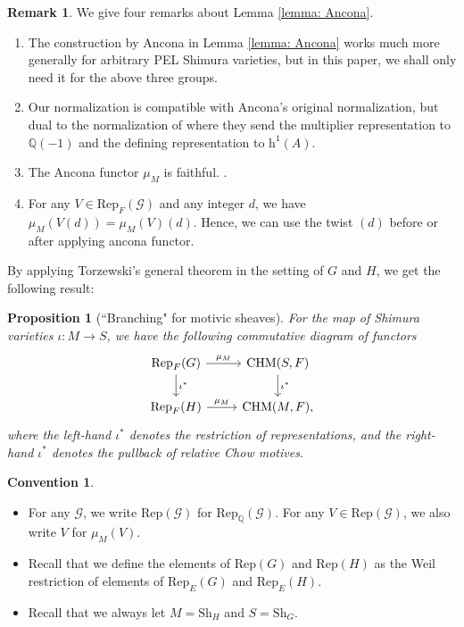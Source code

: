 \documentclass[11pt, a4paper]{amsart}
\theoremstyle{plain}
\newtheorem{proposition}[theorem]{Proposition}
\theoremstyle{definition}
\newtheorem{remark}[theorem]{Remark}
\newtheorem{convention}[theorem]{Convention}
\numberwithin{equation}{section}
\def\calG{\mathcal{G}}
\def\QQ{\mathbb{Q}}
\newcommand{\Sh}{\mathrm{Sh}}
\begin{document}
\begin{remark} We give four remarks about Lemma \ref{lemma: Ancona}. 
\begin{enumerate}
    \item The construction by Ancona in Lemma \ref{lemma: Ancona} works much more generally for arbitrary PEL Shimura varieties, but in this paper, we shall only need it for the above three groups.
    \item Our normalization is compatible with Ancona's original normalization, but dual to the normalization of \cite[Theorem 8.3.1]{LSZ22} where they send the multiplier representation to $\QQ(-1)$ and the defining representation to $\mathrm{h}^{1}(A)$.
    \item The Ancona functor $\mu_{M}$ is faithful. \cite[REMARK 5.10]{Torzewski19}. 
    \item For any $V \in \mathrm{Rep}_{F}(\calG)$ and any integer $d$, we have $\mu_{M}(V(d)) = \mu_{M}(V)(d)$. Hence, we can use the twist $(d)$ before or after applying ancona functor. 
\end{enumerate}
\end{remark}

\par By applying Torzewski's general theorem \cite[Theorem 9.7]{Torzewski19} in the setting of $G$ and $H$, we get the following result: 
\begin{proposition}[``Branching" for motivic sheaves]
For the map of Shimura varieties $\iota: M \rightarrow S$, we have the following commutative diagram of functors 
\[
    \begin{tikzcd}
        \mathrm{Rep}_{F}(G) \ar[d, "\iota^{*}"] \ar[r, "\mu_{M}"] & \mathrm{CHM}(S, F) \ar[d, "\iota^{*}"] \\
        \mathrm{Rep}_{F}(H) \ar[r, "\mu_{M}"] & \mathrm{CHM}(M, F), 
    \end{tikzcd}
\]
where the left-hand $\iota^{*}$ denotes the restriction of representations, and the right-hand $\iota^{*}$ denotes the pullback of relative Chow motives.

\end{proposition}

\begin{convention}
\begin{itemize}
    \item For any $\mathcal{G}$, we write $\mathrm{Rep}(\mathcal{G})$ for $\mathrm{Rep}_{\QQ}(\mathcal{G})$. For any $V \in \mathrm{Rep}(\mathcal{G})$, we also write $V$ for $\mu_{M}(V)$. 
    \item Recall that we define the elements of $\mathrm{Rep}(G)$ and $\mathrm{Rep}(H)$ as the Weil restriction of elements of $\mathrm{Rep}_{E}(G)$ and $\mathrm{Rep}_{E}(H)$. 
    \item Recall that we always let $M = \Sh_{H}$ and $S = \Sh_{G}$. 
\end{itemize}
\end{convention}
\end{document}

